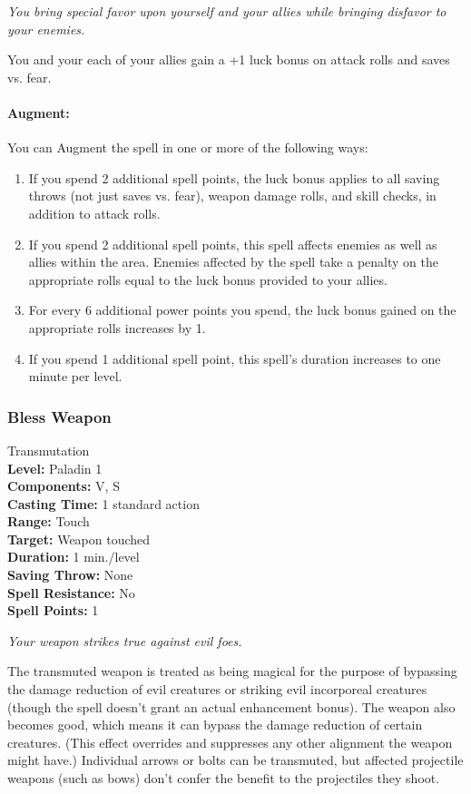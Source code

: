 \emph{You bring special favor upon yourself and your allies while bringing disfavor to your enemies.}

You and your each of your allies gain a +1 luck bonus on attack rolls and saves vs. fear.

\paragraph{Augment:} You can Augment the spell in one or more of the following ways:
\begin{enumerate}
 \item If you spend 2 additional spell points, the luck bonus applies to all saving throws (not just saves vs. fear),
 weapon damage rolls, and skill checks, in addition to attack rolls.
 \item If you spend 2 additional spell points, this spell affects enemies as well as allies within the area.
 Enemies affected by the spell take a penalty on the appropriate rolls equal to the luck bonus provided to your allies.
 \item For every 6 additional power points you spend, the luck bonus gained on the appropriate rolls increases by 1.
 \item If you spend 1 additional spell point, this spell's duration increases to one minute per level.
\end{enumerate}
\subsubsection{Bless Weapon}
\label{Spell:BlessWeapon}
Transmutation
\\ \textbf{Level:} Paladin 1
\\ \textbf{Components:} V, S
\\ \textbf{Casting Time:} 1 standard action
\\ \textbf{Range:} Touch
\\ \textbf{Target:} Weapon touched
\\ \textbf{Duration:} 1 min./level
\\ \textbf{Saving Throw:} None
\\ \textbf{Spell Resistance:} No
\\ \textbf{Spell Points:} 1

\emph{Your weapon strikes true against evil foes.}

The transmuted weapon is treated as being magical for the purpose of bypassing the damage reduction of evil creatures or striking evil incorporeal creatures (though the spell doesn't grant an actual enhancement bonus). 
The weapon also becomes good, which means it can bypass the damage reduction of certain creatures. 
(This effect overrides and suppresses any other alignment the weapon might have.) 
Individual arrows or bolts can be transmuted, but affected projectile weapons (such as bows) don't confer the benefit to the projectiles they shoot.


